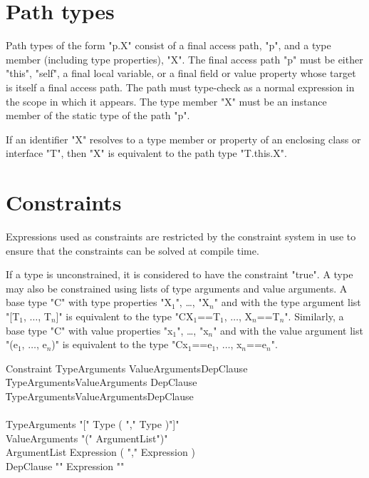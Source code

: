 \section{Path types}

Path types of the form \xcd"p.X" consist of a final access path,
\xcd"p", and a type
member (including type properties), \xcd"X".
The final access path \xcd"p" must be either \xcd"this", \xcd"self", a final
local variable, or a final field or value property whose target
is itself a final access path.  The path must type-check 
as a normal expression in the scope in which it appears.
The type member
\xcd"X" must be an instance member of the static type of the
path \xcd"p".

If an identifier \xcd"X" resolves to a type member or property
of an enclosing class or interface \xcd"T", then \xcd"X" is equivalent to
the path type \xcd"T.this.X".

%

\section{Constraints}\label{DepTypes}

Expressions used as constraints are restricted by the
constraint system in use to ensure that the constraints can
be solved at compile time.

If a type is unconstrained, it is considered to have the
constraint \xcd"true".
A type may also be constrained using lists of type arguments and
value arguments.  A base type \xcd"C" with type properties
\xcdmath"X$_1$", \dots,
\xcdmath"X$_n$" and
with the type argument list
\xcdmath"[T$_1$, $\dots$, T$_n$]" is equivalent to the type
\xcdmath"C{X$_1$==T$_1$, $\dots$, X$_n$==T$_n$}".
Similarly, a base type \xcd"C" with value properties
\xcdmath"x$_1$", \dots,
\xcdmath"x$_n$" and
with the value argument list
\xcdmath"(e$_1$, $\dots$, e$_n$)" is equivalent to the type
\xcdmath"C{x$_1$==e$_1$, $\dots$, x$_n$==e$_n$}".

\def\withmath#1{\relax\ifmmode#1\else{$#1$}\fi}
\def\LL#1{\withmath{\lbrack\!\lbrack #1\rbrack\!\rbrack}}

\begin{grammar}
Constraint \: TypeArguments     ValueArguments\opt DepClause\opt \\
           \| TypeArguments\opt ValueArguments     DepClause\opt \\
           \| TypeArguments\opt ValueArguments\opt DepClause     \\
           \\
TypeArguments    \:  \xcd"[" Type ( \xcd"," Type )\star \xcd"]" \\
ValueArguments   \:  \xcd"(" ArgumentList\opt \xcd")" \\
ArgumentList     \:  Expression ( \xcd"," Expression )\star \\
DepClause        \: \xcd"{" Expression \xcd"}" \\
\end{grammar}

